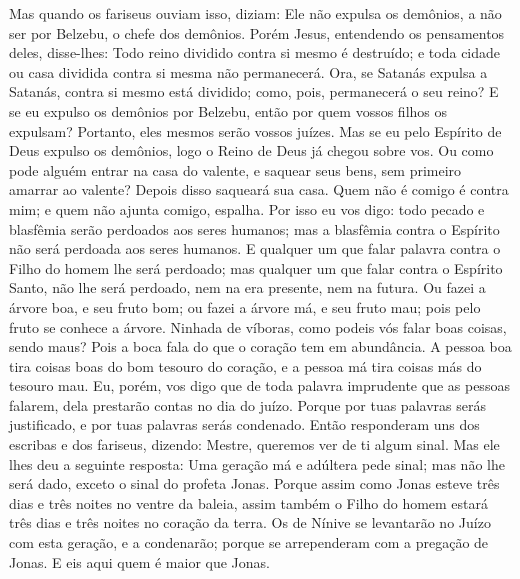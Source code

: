 {  Mas quando os fariseus ouviam isso, diziam: Ele não expulsa os demônios, a não ser por Belzebu, o chefe dos demônios.
  Porém Jesus, entendendo os pensamentos deles, disse-lhes: Todo reino dividido contra si mesmo é destruído; e toda cidade ou casa dividida contra si mesma não permanecerá.
  Ora, se Satanás expulsa a Satanás, contra si mesmo está dividido; como, pois, permanecerá o seu reino?
  E se eu expulso os demônios por Belzebu, então por quem vossos filhos
 os expulsam? Portanto, eles mesmos serão vossos juízes.
  Mas se eu pelo Espírito de Deus expulso os demônios, logo o Reino de Deus já chegou sobre vos.
  Ou como pode alguém entrar na casa do valente, e saquear seus bens, sem primeiro amarrar ao valente? Depois disso saqueará sua casa.
  Quem não é comigo é contra mim; e quem não ajunta comigo, espalha.
  Por isso eu vos digo: todo pecado e blasfêmia serão perdoados aos seres humanos; mas a blasfêmia contra o Espírito não será perdoada aos seres humanos.
  E qualquer um que falar palavra contra o Filho do homem lhe será perdoado; mas qualquer um que falar contra o Espírito Santo, não lhe será perdoado, nem na era presente, nem na futura.
  Ou fazei a árvore boa, e seu fruto bom; ou fazei a árvore má, e seu fruto mau; pois pelo fruto se conhece a árvore.
  Ninhada de víboras, como podeis vós falar boas coisas, sendo maus? Pois a boca fala do que o coração tem em abundância.
  A pessoa boa tira coisas boas do bom tesouro do coração, e a pessoa má tira coisas más do tesouro mau.
  Eu, porém, vos digo que de toda palavra imprudente
 que as pessoas falarem, dela prestarão contas no dia do juízo.
  Porque por tuas palavras serás justificado,
 e por tuas palavras serás condenado.
  Então responderam uns dos escribas e dos fariseus, dizendo: Mestre, queremos ver de ti algum sinal.
  Mas ele lhes deu a seguinte resposta: Uma geração má e adúltera pede sinal; mas não lhe será dado, exceto o sinal do profeta Jonas.
  Porque assim como Jonas esteve três dias e três noites no ventre da baleia,
 assim também o Filho do homem estará três dias e três noites no coração da terra.
  Os de Nínive se levantarão no Juízo com esta geração, e a condenarão; porque se arrependeram com a pregação de Jonas. E eis aqui quem é maior que Jonas.
}
